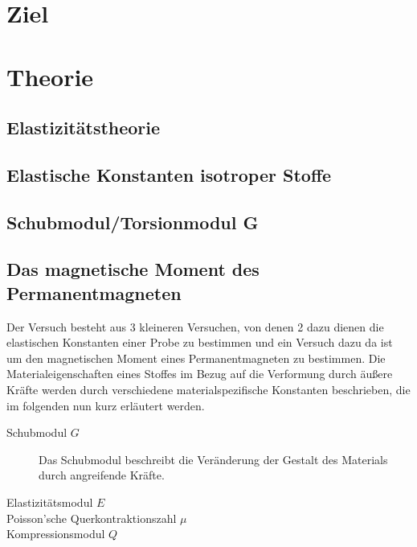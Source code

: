 \section{Ziel}

\section{Theorie}
\subsection{Elastizitätstheorie}
\subsection{Elastische Konstanten isotroper Stoffe}
\subsection{Schubmodul/Torsionmodul G}
\subsection{Das magnetische Moment des Permanentmagneten}
\label{sec:Theorie}
Der Versuch besteht aus 3 kleineren Versuchen, von denen 2 dazu dienen die elastischen Konstanten einer Probe zu bestimmen und ein Versuch dazu da ist um den magnetischen Moment eines Permanentmagneten zu bestimmen.
Die Materialeigenschaften eines Stoffes im Bezug auf die Verformung durch äußere Kräfte werden durch verschiedene materialspezifische Konstanten beschrieben, die im folgenden nun kurz erläutert werden.
\begin{description}
    \item[Schubmodul $G$]
        Das Schubmodul beschreibt die Veränderung der Gestalt des Materials durch angreifende Kräfte.
    \item[Elastizitätsmodul $E$]
    \item[Poisson'sche Querkontraktionszahl $\mu$]
    \item[Kompressionsmodul $Q$]
\end{description}